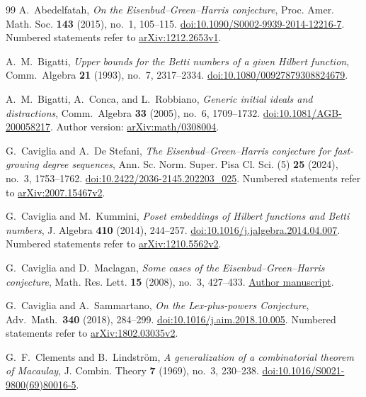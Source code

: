 \begin{thebibliography}{99}
A.~Abedelfatah,
\emph{On the Eisenbud--Green--Harris conjecture},
Proc. Amer. Math. Soc. \textbf{143} (2015), no.~1, 105--115.
\href{https://doi.org/10.1090/S0002-9939-2014-12216-7}{doi:10.1090/S0002-9939-2014-12216-7}.
Numbered statements refer to
\href{https://arxiv.org/abs/1212.2653v1}{arXiv:1212.2653v1}.

A.~M.~Bigatti,
\emph{Upper bounds for the Betti numbers of a given Hilbert function},
Comm.\ Algebra \textbf{21} (1993), no.~7, 2317--2334.
\href{https://doi.org/10.1080/00927879308824679}{doi:10.1080/00927879308824679}.

A.~M.~Bigatti, A.~Conca, and L.~Robbiano,
\emph{Generic initial ideals and distractions},
Comm.\ Algebra \textbf{33} (2005), no.~6, 1709--1732.
\href{https://doi.org/10.1081/AGB-200058217}{doi:10.1081/AGB-200058217}.
Author version:
\href{https://arxiv.org/abs/math/0308004}{arXiv:math/0308004}.

G.~Caviglia and A.~De Stefani,
\emph{The Eisenbud--Green--Harris conjecture for fast-growing degree sequences},
Ann. Sc. Norm. Super. Pisa Cl. Sci. (5) \textbf{25} (2024), no.~3,
1753--1762.
\href{https://doi.org/10.2422/2036-2145.202203_025}{doi:10.2422/2036-2145.202203\_025}.
Numbered statements refer to
\href{https://arxiv.org/abs/2007.15467v2}{arXiv:2007.15467v2}.

G.~Caviglia and M.~Kummini,
\emph{Poset embeddings of Hilbert functions and Betti numbers},
J. Algebra \textbf{410} (2014), 244--257.
\href{https://doi.org/10.1016/j.jalgebra.2014.04.007}{doi:10.1016/j.jalgebra.2014.04.007}.
Numbered statements refer to
\href{https://arxiv.org/abs/1210.5562v2}{arXiv:1210.5562v2}.

G.~Caviglia and D.~Maclagan,
\emph{Some cases of the Eisenbud--Green--Harris conjecture},
Math. Res. Lett. \textbf{15} (2008), no.~3, 427--433.
\href{https://www.math.purdue.edu/~gcavigli/Articles-PDF/%5B4%5D.pdf}{Author manuscript}.

G.~Caviglia and A.~Sammartano,
\emph{On the Lex-plus-powers Conjecture},
Adv.\ Math.\ \textbf{340} (2018), 284--299.
\href{https://doi.org/10.1016/j.aim.2018.10.005}{doi:10.1016/j.aim.2018.10.005}.
Numbered statements refer to
\href{https://arxiv.org/abs/1802.03035v2}{arXiv:1802.03035v2}.

G.~F.~Clements and B.~Lindstr\"om,
\emph{A generalization of a combinatorial theorem of Macaulay},
J. Combin. Theory \textbf{7} (1969), no.~3, 230--238.
\href{https://doi.org/10.1016/S0021-9800(69)80016-5}{doi:10.1016/S0021-9800(69)80016-5}.


\end{thebibliography}
